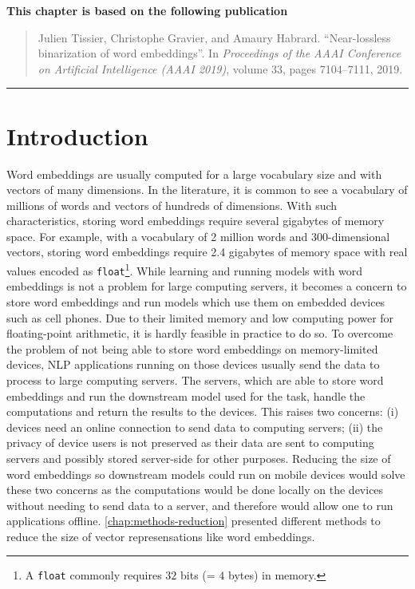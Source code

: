 {\centering
  \small
  \textbf{This chapter is based on the following publication}
  \begin{quote}
    {Julien Tissier, Christophe Gravier, and Amaury Habrard. ``Near-lossless
    binarization of word embeddings''. In \textit{Proceedings of the AAAI
    Conference on Artificial Intelligence (AAAI 2019)}, volume 33, pages
    7104–7111, 2019.}
  \end{quote}
  \noindent\rule{\textwidth}{1pt}
}

\section{Introduction}
  \label{ch06:sec:introduction}
  Word embeddings are usually computed for a large vocabulary size and with
  vectors of many dimensions. In the literature, it is common to see a
  vocabulary of millions of words and vectors of hundreds of dimensions. With
  such characteristics, storing word embeddings require several gigabytes of
  memory space. For example, with a vocabulary of 2 million words and
  300-dimensional vectors, storing word embeddings require 2.4 gigabytes of
  memory space with real values encoded as \texttt{float}\footnote{A
  \texttt{float} commonly requires $32$ bits (= $4$ bytes) in memory.}. While
  learning and running models with word embeddings is not a problem for large
  computing servers, it becomes a concern to store word embeddings and run
  models which use them on embedded devices such as cell phones. Due to their
  limited memory and low computing power for floating-point arithmetic, it is
  hardly feasible in practice to do so. To overcome the problem of not being
  able to store word embeddings on memory-limited devices, NLP applications
  running on those devices usually send the data to process to large computing
  servers. The servers, which are able to store word embeddings and run the
  downstream model used for the task, handle the computations and return the
  results to the devices. This raises two concerns: (i) devices need an online
  connection to send data to computing servers; (ii) the privacy of device
  users is not preserved as their data are sent to computing servers and
  possibly stored server-side for other purposes. Reducing the size of word
  embeddings so downstream models could run on mobile devices would solve these
  two concerns as the computations would be done locally on the devices without
  needing to send data to a server, and therefore would allow one to run
  applications offline. \autoref{chap:methods-reduction} presented different
  methods to reduce the size of vector represensations like word embeddings.
  \medskip


